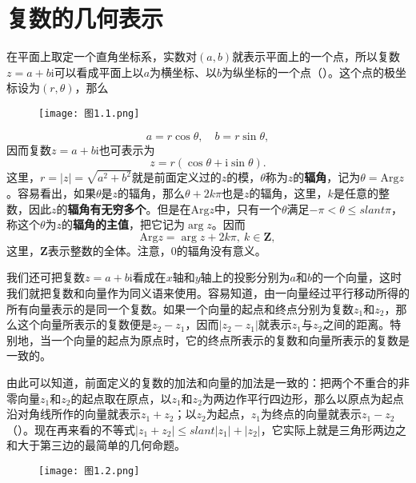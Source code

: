 \documentclass[../../main.tex]{subfiles}
\begin{document}
\section{复数的几何表示}\label{section:复数的几何表示}

在平面上取定一个直角坐标系，实数对\((a,b)\)就表示平面上的一个点，所以复数\(z = a + b\mathrm{i}\)可以看成平面上以\(a\)为横坐标、以\(b\)为纵坐标的一个点（）。这个点的极坐标设为\((r,\theta)\)，那么
\begin{figure}[H]
\centering
\texttt{[image: 图1.1.png]}
\caption{}
\label{figure:图1.1}
\end{figure}
\[
a = r\cos\theta, \quad b = r\sin\theta,
\]
因而复数\(z = a + b\mathrm{i}\)也可表示为
\[
z = r(\cos\theta + \mathrm{i}\sin\theta).
\]
这里，\(r = |z| = \sqrt{a^2 + b^2}\)就是前面定义过的\(z\)的模，\(\theta\)称为\(z\)的\textbf{辐角}，记为\(\theta = \mathrm{Arg}z\)。容易看出，如果\(\theta\)是\(z\)的辐角，那么\(\theta + 2k\pi\)也是\(z\)的辐角，这里，\(k\)是任意的整数，因此\(z\)的\textbf{辐角有无穷多个}。但是在\(\mathrm{Arg}z\)中，只有一个\(\theta\)满足\(-\pi < \theta \leqslant slant \pi\)，称这个\(\theta\)为\(z\)的\textbf{辐角的主值}，把它记为\(\arg z\)。因而
\[
\mathrm{Arg}z = \arg z + 2k\pi, \ k \in \mathbf{Z},
\]
这里，\(\mathbf{Z}\)表示整数的全体。注意，\(0\)的辐角没有意义。

我们还可把复数\(z = a + b\mathrm{i}\)看成在\(x\)轴和\(y\)轴上的投影分别为\(a\)和\(b\)的一个向量，这时我们就把复数和向量作为同义语来使用。容易知道，由一向量经过平行移动所得的所有向量表示的是同一个复数。如果一个向量的起点和终点分别为复数\(z_1\)和\(z_2\)，那么这个向量所表示的复数便是\(z_2 - z_1\)，因而\(|z_2 - z_1|\)就表示\(z_1\)与\(z_2\)之间的距离。特别地，当一个向量的起点为原点时，它的终点所表示的复数和向量所表示的复数是一致的。

由此可以知道，前面定义的复数的加法和向量的加法是一致的：把两个不重合的非零向量\(z_1\)和\(z_2\)的起点取在原点，以\(z_1\)和\(z_2\)为两边作平行四边形，那么以原点为起点沿对角线所作的向量就表示\(z_1 + z_2\)；以\(z_2\)为起点，\(z_1\)为终点的向量就表示\(z_1 - z_2\)（）。现在再来看的不等式\(|z_1 + z_2| \leqslant slant |z_1| + |z_2|\)，它实际上就是三角形两边之和大于第三边的最简单的几何命题。
\begin{figure}[H]
\centering
\texttt{[image: 图1.2.png]}
\caption{}
\label{figure:图1.2}
\end{figure}
\end{document}

